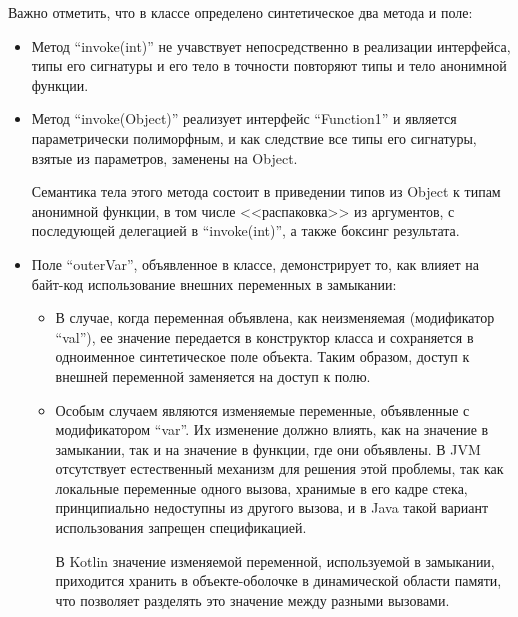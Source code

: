 Важно отметить, что в классе определено синтетическое два метода и поле:
\begin{itemize}
    \item Метод ``invoke(int)'' не учавствует непосредственно в реализации интерфейса, типы его
    сигнатуры и его тело в точности повторяют типы и тело анонимной функции.

    \item Метод ``invoke(Object)'' реализует интерфейс ``Function1'' и является параметрически полиморфным,
    и как следствие все типы его сигнатуры, взятые из параметров, заменены на Object.

    Семантика тела этого метода состоит в приведении типов из Object к типам анонимной функции,
    в том числе <<распаковка>> из аргументов, с последующей
    делегацией в ``invoke(int)'', а также боксинг результата.

    \item Поле ``outerVar'', объявленное в классе, демонстрирует то, как влияет на байт-код
    использование внешних переменных в замыкании:
    \begin{itemize}
        \item В случае, когда переменная объявлена, как неизменяемая (модификатор ``val''), ее
        значение передается в конструктор класса и сохраняется в одноименное синтетическое поле
        объекта.
        Таким образом, доступ к внешней переменной заменяется на доступ к полю.
        \item Особым случаем являются изменяемые переменные, объявленные с модификатором ``var''.
        Их изменение должно влиять, как на значение в замыкании, так и на значение в функции, где
        они объявлены. В JVM отсутствует естественный механизм для решения этой проблемы, так как
        локальные переменные одного вызова, хранимые в его кадре стека, принципиально недоступны
        из другого вызова, и в Java такой вариант использования запрещен спецификацией.

        В Kotlin значение изменяемой переменной, используемой в замыкании, приходится хранить
        в объекте-оболочке в динамической области памяти, что позволяет разделять это значение
        между разными вызовами.
    \end{itemize}
\end{itemize}
